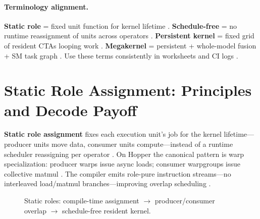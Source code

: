 \paragraph{Terminology alignment.}
\textbf{Static role} = fixed unit function for kernel lifetime \citep{shah2024flashattention3,mpk2025}.
\textbf{Schedule-free} = no runtime reassignment of units across operators \citep{taxbreak2026,patel2025llminference}.
\textbf{Persistent kernel} = fixed grid of resident CTAs looping work \citep{shah2024flashattention3,nvidia2024cudagraphs}.
\textbf{Megakernel} = persistent + whole-model fusion + SM task graph \citep{mpk2025,wu2024mirage,yirage2026}.
Use these terms consistently in worksheets and CI logs \citep{chen2020compilerbasedhardw,taxbreak2026}.


\section{Static Role Assignment: Principles and Decode Payoff}
\label{sec:ch07_static_roles}

\textbf{Static role assignment} fixes each execution unit's job for the kernel lifetime---producer units move data, consumer units compute---instead of a runtime scheduler reassigning per operator \citep{shah2024flashattention3,mpk2025}.
On Hopper the canonical pattern is warp specialization: producer warps issue async loads; consumer warpgroups issue collective matmul \citep{shah2024flashattention3,semianalysis2024tma}.
The compiler emits role-pure instruction streams---no interleaved load/matmul branches---improving overlap scheduling \citep{shah2024flashattention3,wu2024mirage}.

\begin{figure}[t]
\centering
{}
\caption{Static roles: compile-time assignment $\rightarrow$ producer/consumer overlap $\rightarrow$ schedule-free resident kernel.}
\label{fig:static_roles_pipeline}
\end{figure}

